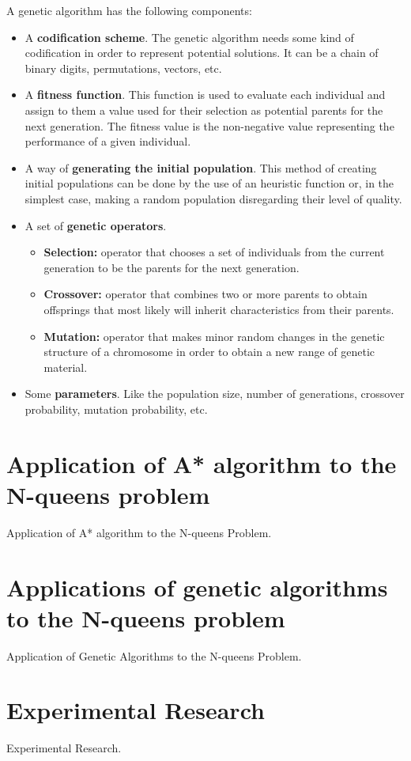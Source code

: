 \documentclass[11pt]{llncs}
\begin{document}
A genetic algorithm has the following components:
\begin{itemize}
    \item A \textbf{codification scheme}. The genetic algorithm needs some kind of codification in order to represent potential solutions. It can be a chain of binary digits, permutations, vectors, etc. 
    \item A \textbf{fitness function}. This function is used to evaluate each individual and assign to them a value used for their selection as potential parents for the next generation. The fitness value is the non-negative value representing the performance of a given individual.
    \item A way of \textbf{generating the initial population}. This method of creating initial populations can be done by the use of an heuristic function or, in the simplest case, making a random population disregarding their level of quality.
    \item A set of \textbf{genetic operators}. 
    \begin{itemize}
        \item \textbf{Selection:} operator that chooses a set of individuals from the current generation to be the parents for the next generation.
        \item \textbf{Crossover:} operator that combines two or more parents to obtain offsprings that most likely will inherit characteristics from their parents.
        \item \textbf{Mutation:} operator that makes minor random changes in the genetic structure of a chromosome in order to obtain a new range of genetic material.
    \end{itemize}
    \item Some \textbf{parameters}. Like the population size, number of generations, crossover probability, mutation probability, etc.
\end{itemize}
\section{Application of A* algorithm to the N-queens problem}\label{astar_nqueens}
Application of A* algorithm to the N-queens Problem.
\section{Applications of genetic algorithms to the N-queens problem}\label{gen_nqueens}
Application of Genetic Algorithms to the N-queens Problem.
\section{Experimental Research}\label{exp_research}
Experimental Research.
\end{document}
